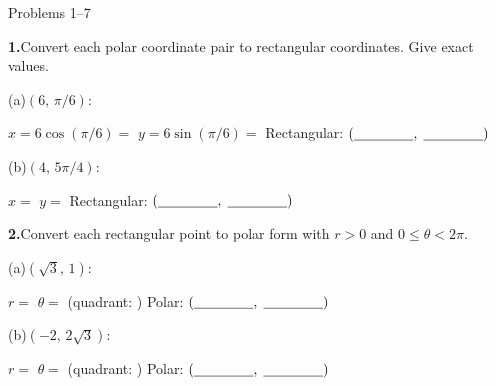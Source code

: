 \documentclass[10pt]{article}
\begin{document}
\namedateperiod

\vspace{0.10in}

\begin{notesbox}{Problems 1--7}

\textbf{1.}\quad Convert each polar coordinate pair to rectangular coordinates.
Give exact values.

\vspace{4pt}
(a)\quad $(6,\, \pi/6)$:

\vspace{4pt}
$x = 6\cos(\pi/6) = $ \underline{\hspace{2.5cm}} \qquad
$y = 6\sin(\pi/6) = $ \underline{\hspace{2.5cm}} \qquad
Rectangular: $(\underline{\hspace{1.5cm}},\; \underline{\hspace{1.5cm}})$

\vspace{8pt}
(b)\quad $(4,\, 5\pi/4)$:

\vspace{4pt}
$x = $ \underline{\hspace{3cm}} \qquad $y = $ \underline{\hspace{3cm}} \qquad
Rectangular: $(\underline{\hspace{1.5cm}},\; \underline{\hspace{1.5cm}})$

\vspace{0.14in}
\textbf{2.}\quad Convert each rectangular point to polar form with $r > 0$
and $0 \le \theta < 2\pi$.

\vspace{4pt}
(a)\quad $(\sqrt{3},\, 1)$:

\vspace{4pt}
$r = $ \underline{\hspace{2.5cm}} \qquad
$\theta = $ \underline{\hspace{3cm}} (quadrant: \underline{\hspace{1cm}}) \qquad
Polar: $(\underline{\hspace{1.5cm}},\; \underline{\hspace{1.5cm}})$

\vspace{8pt}
(b)\quad $(-2,\, 2\sqrt{3})$:

\vspace{4pt}
$r = $ \underline{\hspace{2.5cm}} \qquad
$\theta = $ \underline{\hspace{3.5cm}} (quadrant: \underline{\hspace{1cm}}) \qquad
Polar: $(\underline{\hspace{1.5cm}},\; \underline{\hspace{1.5cm}})$


\end{notesbox}
\end{document}
